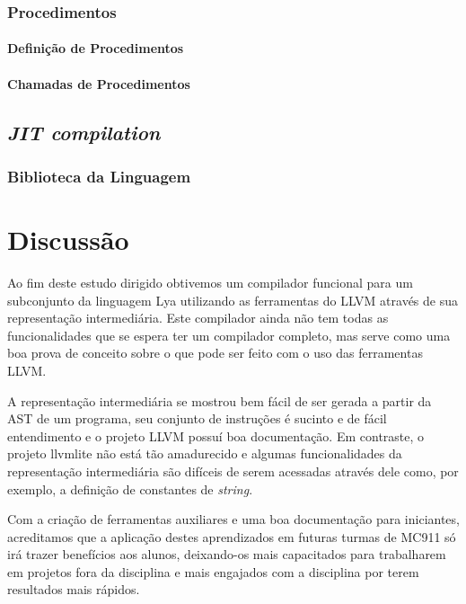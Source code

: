\documentclass[11pt, oneside, titlepage]{report}
\begin{document}
        \subsection{Procedimentos}

          \subsubsection{Definição de Procedimentos}

          \subsubsection{Chamadas de Procedimentos}

      \section{\textit{JIT compilation}}

        \subsection{Biblioteca da Linguagem}

    \chapter{Discussão}

      Ao fim deste estudo dirigido obtivemos um compilador funcional para um subconjunto da linguagem Lya utilizando as
      ferramentas do LLVM através de sua representação intermediária. Este compilador ainda não tem todas as
      funcionalidades que se espera ter um compilador completo, mas serve como uma boa prova de conceito sobre o que
      pode ser feito com o uso das ferramentas LLVM.

      A representação intermediária se mostrou bem fácil de ser gerada a partir da AST de um programa, seu conjunto de
      instruções é sucinto e de fácil entendimento e o projeto LLVM possuí boa documentação. Em contraste, o projeto
      llvmlite não está tão amadurecido e algumas funcionalidades da representação intermediária são difíceis de serem
      acessadas através dele como, por exemplo, a definição de constantes de \textit{string}.

      Com a criação de ferramentas auxiliares e uma boa documentação para iniciantes, acreditamos que a aplicação destes
      aprendizados em futuras turmas de MC911 só irá trazer benefícios aos alunos, deixando-os mais capacitados para
      trabalharem em projetos fora da disciplina e mais engajados com a disciplina por terem resultados mais rápidos.
\end{document}
